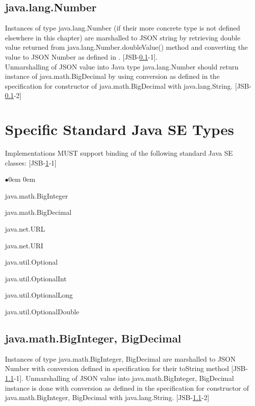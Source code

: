 \subsection{java.lang.Number}
\label{subsec:abstractnumber}
Instances of type java.lang.Number (if their more concrete type is not defined elsewhere in this chapter) are marshalled to JSON string by retrieving double value returned from java.lang.Number.doubleValue() method and converting the value to JSON Number as defined in . [JSB-\ref{subsec:abstractnumber}-1].\\
Unmarshalling of JSON value into Java type java.lang.Number should return instance of java.math.BigDecimal by using conversion as defined in the specification for constructor of java.math.BigDecimal with java.lang.String. [JSB-\ref{subsec:abstractnumber}-2]

\section{Specific Standard Java SE Types}
\label{sec:specific}
Implementations MUST support binding of the following standard Java SE classes: [JSB-\ref{sec:specific}-1]
\begin{list}{$\bullet$}{\parsep 0em  0em}
\item java.math.BigInteger
\item java.math.BigDecimal
\item java.net.URL
\item java.net.URI
\item java.util.Optional
\item java.util.OptionalInt
\item java.util.OptionalLong
\item java.util.OptionalDouble
\end{list}

\subsection{java.math.BigInteger, BigDecimal}
\label{subsec:bignumber}
Instances of type java.math.BigInteger, BigDecimal are marshalled to JSON Number with conversion defined in specification for their toString method [JSB-\ref{subsec:bignumber}-1]. Unmarshalling of JSON value into java.math.BigInteger, BigDecimal instance is done with conversion as defined in the specification for constructor of java.math.BigInteger, BigDecimal with java.lang.String. [JSB-\ref{subsec:bignumber}-2]

